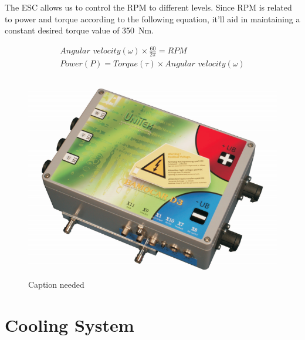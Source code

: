 \documentclass[main.tex]{subfiles}
\begin{document}
	The ESC allows us to control the RPM to different levels. Since RPM is related to power and torque according to the following equation, it'll aid in maintaining a constant desired torque value of \SI{350}{Nm}.

     \begin{gather*}
     	\textit{Angular velocity} (\omega) \times \frac{60}{2\pi} = \textit{RPM}\\
     	\textit{Power} (P) = \textit{Torque} (\tau)  \times \textit{Angular velocity} (\omega)\\
     \end{gather*}

    \begin{figure}[H]
        \centering
        \includegraphics[width=\linewidth]{images/fig17}
        \caption{Caption needed}
    \end{figure}

    \section{Cooling System}
\end{document}
